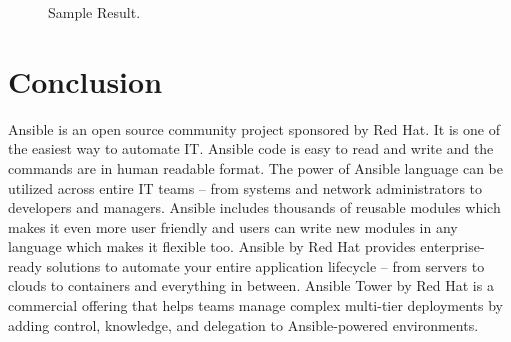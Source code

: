 \documentclass[9pt,twocolumn,twoside]{../../styles/osajnl}
\begin{document}
\begin{figure}[htbp]
\centering
{}
\caption{Sample Result.}
\label{fig:false-color}
\end{figure}

\section{Conclusion}

Ansible is an open source community project sponsored by Red Hat. It
is one of the easiest way to automate IT. Ansible code is easy to read
and write and the commands are in human readable format. The power of
Ansible language can be utilized across entire IT teams – from systems
and network administrators to developers and managers. Ansible
includes thousands of reusable modules which makes it even more user
friendly and users can write new modules in any language which makes
it flexible too. Ansible by Red Hat provides enterprise-ready
solutions to automate your entire application lifecycle – from servers
to clouds to containers and everything in between. Ansible Tower by
Red Hat is a commercial offering that helps teams manage complex
multi-tier deployments by adding control, knowledge, and delegation to
Ansible-powered environments.



\end{document}
